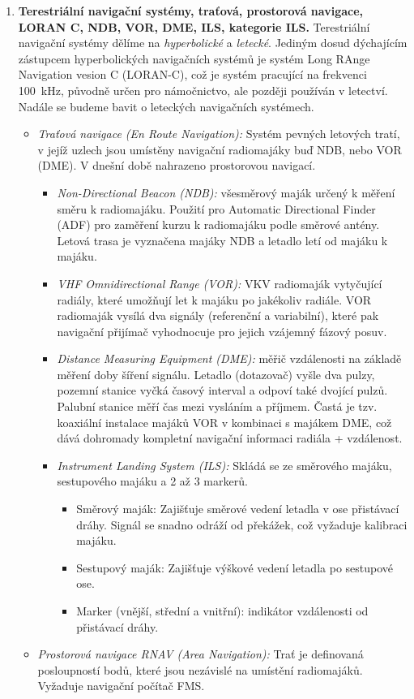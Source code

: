 \documentclass[11pt,a4paper]{article}
\begin{document}
\begin{enumerate}
    \item \textbf{Terestriální navigační systémy, traťová, prostorová navigace, LORAN C, NDB, VOR, DME, ILS, kategorie ILS.} Terestriální navigační systémy dělíme na \emph{hyperbolické} a \emph{letecké}. Jediným dosud dýchajícím zástupcem hyperbolických navigačních systémů je systém Long RAnge Navigation vesion C (LORAN-C), což je systém pracující na frekvenci 100~kHz, původně určen pro námočnictvo, ale později používán v letectví. Nadále se budeme bavit o leteckých navigačních systémech.
    \begin{itemize}
        \item \emph{Traťová navigace (En Route Navigation):} Systém pevných letových tratí, v jejíž uzlech jsou umístěny navigační radiomajáky buď NDB, nebo VOR (DME). V dnešní době nahrazeno prostorovou navigací.
        \begin{itemize}
            \item \emph{Non-Directional Beacon (NDB):} všesměrový maják určený k měření směru k radiomajáku. Použití pro Automatic Directional Finder (ADF) pro zaměření kurzu k radiomajáku podle směrové antény. Letová trasa je vyznačena majáky NDB a letadlo letí od majáku k majáku.
            \item \emph{VHF Omnidirectional Range (VOR):} VKV radiomaják vytyčující radiály, které umožňují let k majáku po jakékoliv radiále. VOR radiomaják vysílá dva signály (referenční a variabilní), které pak navigační přijímač vyhodnocuje pro jejich vzájemný fázový posuv.
            \item \emph{Distance Measuring Equipment (DME):} měřič vzdálenosti na základě měření doby šíření signálu. Letadlo (dotazovač) vyšle dva pulzy, pozemní stanice vyčká časový interval a odpoví také dvojící pulzů. Palubní stanice měří čas mezi vysláním a příjmem. Častá je tzv. koaxiální instalace majáků VOR v kombinaci s majákem DME, což dává dohromady kompletní navigační informaci radiála + vzdálenost.
            \item \emph{Instrument Landing System (ILS):} Skládá se ze směrového majáku, sestupového majáku a 2 až 3 markerů.
            \begin{itemize}
                \item Směrový maják: Zajišťuje směrové vedení letadla v ose přistávací dráhy. Signál se snadno odráží od překážek, což vyžaduje kalibraci majáku.
                \item Sestupový maják: Zajišťuje výškové vedení letadla po sestupové ose.
                \item Marker (vnější, střední a vnitřní): indikátor vzdálenosti od přistávací dráhy.
            \end{itemize}
        \end{itemize}
        \item \emph{Prostorová navigace RNAV (Area Navigation):} Trať je definovaná posloupností bodů, které jsou nezávislé na umístění radiomajáků. Vyžaduje navigační počítač FMS.
    \end{itemize}
    

\end{enumerate}
\end{document}
